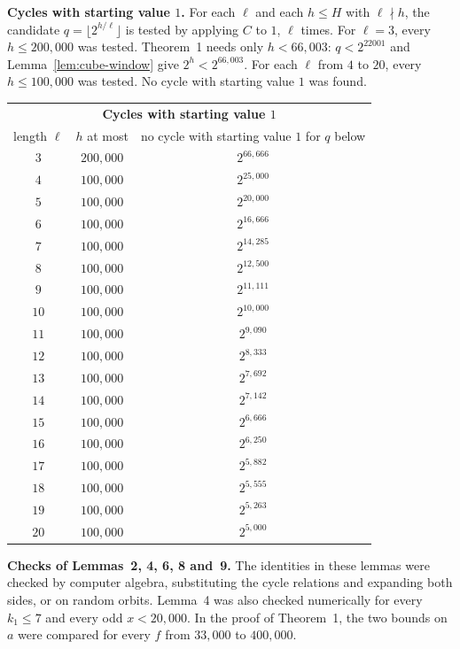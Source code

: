\documentclass[11pt]{article}
\newcommand{\topic}[1]{\par\noindent\textbf{#1}}
\begin{document}
\topic{Cycles with starting value $1$.}
For each $\ell$ and each $h \le H$ with $\ell \nmid h$, the candidate $q = \lfloor 2^{h/\ell}\rfloor$ is tested by applying $C$ to $1$, $\ell$ times.
For $\ell = 3$, every $h \le 200{,}000$ was tested.
Theorem~1 needs only $h < 66{,}003$: $q < 2^{22001}$ and Lemma~\ref{lem:cube-window} give $2^h < 2^{66{,}003}$.
For each $\ell$ from $4$ to $20$, every $h \le 100{,}000$ was tested.
No cycle with starting value $1$ was found.
\begin{center}
\begin{tabular}{ccc}
\multicolumn{3}{c}{\textbf{Cycles with starting value $1$}} \\[0.4em]
length $\ell$ & $h$ at most & no cycle with starting value $1$ for $q$ below \\
$3$ & $200{,}000$ & $2^{66{,}666}$ \\
$4$ & $100{,}000$ & $2^{25{,}000}$ \\
$5$ & $100{,}000$ & $2^{20{,}000}$ \\
$6$ & $100{,}000$ & $2^{16{,}666}$ \\
$7$ & $100{,}000$ & $2^{14{,}285}$ \\
$8$ & $100{,}000$ & $2^{12{,}500}$ \\
$9$ & $100{,}000$ & $2^{11{,}111}$ \\
$10$ & $100{,}000$ & $2^{10{,}000}$ \\
$11$ & $100{,}000$ & $2^{9{,}090}$ \\
$12$ & $100{,}000$ & $2^{8{,}333}$ \\
$13$ & $100{,}000$ & $2^{7{,}692}$ \\
$14$ & $100{,}000$ & $2^{7{,}142}$ \\
$15$ & $100{,}000$ & $2^{6{,}666}$ \\
$16$ & $100{,}000$ & $2^{6{,}250}$ \\
$17$ & $100{,}000$ & $2^{5{,}882}$ \\
$18$ & $100{,}000$ & $2^{5{,}555}$ \\
$19$ & $100{,}000$ & $2^{5{,}263}$ \\
$20$ & $100{,}000$ & $2^{5{,}000}$ \\
\end{tabular}
\end{center}

\topic{Checks of Lemmas~2, 4, 6, 8 and~9.}
The identities in these lemmas were checked by computer algebra, substituting the cycle relations and expanding both sides, or on random orbits.
Lemma~4 was also checked numerically for every $k_1 \le 7$ and every odd $x < 20{,}000$.
In the proof of Theorem~1, the two bounds on $a$ were compared for every $f$ from $33{,}000$ to $400{,}000$.
\end{document}
